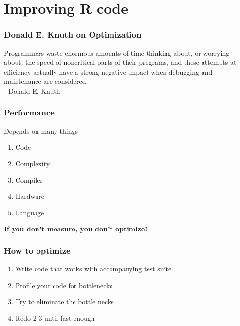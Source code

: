 \documentclass{beamer}
\begin{document}
\section{Improving R code}

\begin{frame}
	\frametitle{Donald E. Knuth on Optimization}
	Programmers waste enormous amounts of time thinking about, or worrying 
	about, the speed of noncritical parts of their programs, and these attempts 
	at efficiency actually have a strong negative impact when debugging and 
	maintenance are considered.\\
	- Donald E. Knuth
\end{frame}

\begin{frame}
	\frametitle{Performance}
	\begin{center}
		Depends on many things
		\begin{enumerate}
			\item Code
			\item Complexity
			\item Compiler
			\item Hardware
			\item Language
		\end{enumerate}
		\bigskip
		\textbf{If you don't measure, you don't optimize!}
	\end{center}
\end{frame}

\begin{frame}
	\frametitle{How to optimize}
	\begin{center}
		\begin{enumerate}
			\item Write code that works with accompanying test suite
			\item Profile your code for bottlenecks
			\item Try to eliminate the bottle necks
			\item Redo 2-3 until fast enough
		\end{enumerate}
	\end{center}
\end{frame}

\end{document}
